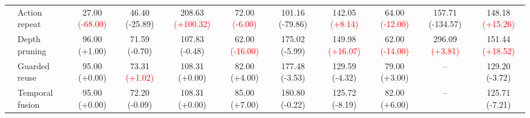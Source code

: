 \begin{table}[t]
{\begin{tabular}{clccccccccc}
& Action repeat
& 27.00 {\scriptsize\textcolor{red}{(-68.00)}} & 46.40 {\scriptsize\textcolor{green!50!black}{(-25.89)}} & 208.63 {\scriptsize\textcolor{red}{(+100.32)}}
& 72.00 {\scriptsize\textcolor{red}{(-6.00)}} & 101.16 {\scriptsize\textcolor{green!50!black}{(-79.86)}} & 142.05 {\scriptsize\textcolor{red}{(+8.14)}}
& 64.00 {\scriptsize\textcolor{red}{(-12.00)}} & 157.71 {\scriptsize\textcolor{green!50!black}{(-134.57)}} & 148.18 {\scriptsize\textcolor{red}{(+15.26)}} \\

& Depth pruning
& 96.00 {\scriptsize\textcolor{green!50!black}{(+1.00)}} & 71.59 {\scriptsize\textcolor{green!50!black}{(-0.70)}} & 107.83 {\scriptsize\textcolor{green!50!black}{(-0.48)}}
& 62.00 {\scriptsize\textcolor{red}{(-16.00)}} & 175.02 {\scriptsize\textcolor{green!50!black}{(-5.99)}} & 149.98 {\scriptsize\textcolor{red}{(+16.07)}}
& 62.00 {\scriptsize\textcolor{red}{(-14.00)}} & 296.09 {\scriptsize\textcolor{red}{(+3.81)}} & 151.44 {\scriptsize\textcolor{red}{(+18.52)}} \\

& Guarded reuse
& 95.00 {\scriptsize\textcolor{green!50!black}{(+0.00)}} & 73.31 {\scriptsize\textcolor{red}{(+1.02)}} & 108.31 {\scriptsize\textcolor{green!50!black}{(+0.00)}}
& 82.00 {\scriptsize\textcolor{green!50!black}{(+4.00)}} & 177.48 {\scriptsize\textcolor{green!50!black}{(-3.53)}} & 129.59 {\scriptsize\textcolor{green!50!black}{(-4.32)}}
& 79.00 {\scriptsize\textcolor{green!50!black}{(+3.00)}} & -- & 129.20 {\scriptsize\textcolor{green!50!black}{(-3.72)}} \\

& Temporal fusion
& 95.00 {\scriptsize\textcolor{green!50!black}{(+0.00)}} & 72.20 {\scriptsize\textcolor{green!50!black}{(-0.09)}} & 108.31 {\scriptsize\textcolor{green!50!black}{(+0.00)}}
& 85.00 {\scriptsize\textcolor{green!50!black}{(+7.00)}} & 180.80 {\scriptsize\textcolor{green!50!black}{(-0.22)}} & 125.72 {\scriptsize\textcolor{green!50!black}{(-8.19)}}
& 82.00 {\scriptsize\textcolor{green!50!black}{(+6.00)}} & -- & 125.71 {\scriptsize\textcolor{green!50!black}{(-7.21)}} \\

\bottomrule
\end{tabular}
}
\end{table}
